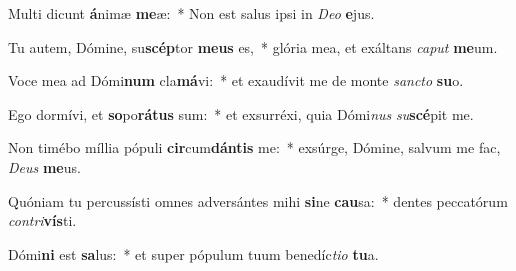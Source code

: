 \item Multi dicunt \textbf{á}nimæ \textbf{me}æ:~* Non est salus ipsi in \textit{De}\textit{o} \textbf{e}jus.
\item Tu autem, Dómine, su\textbf{scép}tor \textbf{me}\textbf{us} es,~* glória mea, et exáltans \textit{ca}\textit{put} \textbf{me}um.
\item Voce mea ad Dómi\textbf{num} cla\textbf{má}vi:~* et exaudívit me de monte \textit{sanc}\textit{to} \textbf{su}o.
\item Ego dormívi, et \textbf{so}po\textbf{rá}\textbf{tus} sum:~* et exsurréxi, quia Dómi\textit{nus} \textit{su}\textbf{scé}pit me.
\item Non timébo míllia pópuli \textbf{cir}cum\textbf{dán}\textbf{tis} me:~* exsúrge, Dómine, salvum me fac, \textit{De}\textit{us} \textbf{me}us.
\item Quóniam tu percussísti omnes adversántes mihi \textbf{si}ne \textbf{cau}sa:~* dentes peccatórum \textit{con}\textit{tri}\textbf{vís}ti.
\item Dómi\textbf{ni} est \textbf{sa}lus:~* et super pópulum tuum benedíc\textit{ti}\textit{o} \textbf{tu}a.

